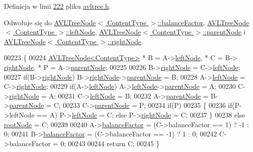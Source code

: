 Definicja w linii \hyperlink{avltree_8h_source_l00222}{222} pliku \hyperlink{avltree_8h_source}{avltree.\-h}.



Odwołuje się do \hyperlink{avltreeelement_8h_source_l00024}{A\-V\-L\-Tree\-Node$<$ Content\-Type $>$\-::balance\-Factor}, \hyperlink{avltreeelement_8h_source_l00019}{A\-V\-L\-Tree\-Node$<$ Content\-Type $>$\-::left\-Node}, \hyperlink{avltreeelement_8h_source_l00019}{A\-V\-L\-Tree\-Node$<$ Content\-Type $>$\-::parent\-Node} i \hyperlink{avltreeelement_8h_source_l00019}{A\-V\-L\-Tree\-Node$<$ Content\-Type $>$\-::right\-Node}.


\begin{DoxyCode}
00223     \{
00224       \hyperlink{class_a_v_l_tree_node}{AVLTreeNode<ContentType>} * B = A->\hyperlink{class_a_v_l_tree_node_afc53d4774f375c23795c9eb598f4d7cd}{leftNode}, * C = B->
      \hyperlink{class_a_v_l_tree_node_a51dfb148f27625c89a3a153760517c38}{rightNode}, * P = A->\hyperlink{class_a_v_l_tree_node_ae64d1261fea217d3e85928e7cf2a9151}{parentNode};
00225 
00226       B->\hyperlink{class_a_v_l_tree_node_a51dfb148f27625c89a3a153760517c38}{rightNode} = C->\hyperlink{class_a_v_l_tree_node_afc53d4774f375c23795c9eb598f4d7cd}{leftNode};
00227       \textcolor{keywordflow}{if}(B->\hyperlink{class_a_v_l_tree_node_a51dfb148f27625c89a3a153760517c38}{rightNode}) B->\hyperlink{class_a_v_l_tree_node_a51dfb148f27625c89a3a153760517c38}{rightNode}->\hyperlink{class_a_v_l_tree_node_ae64d1261fea217d3e85928e7cf2a9151}{parentNode} = B;
00228       A->\hyperlink{class_a_v_l_tree_node_afc53d4774f375c23795c9eb598f4d7cd}{leftNode} = C->\hyperlink{class_a_v_l_tree_node_a51dfb148f27625c89a3a153760517c38}{rightNode};
00229       \textcolor{keywordflow}{if}(A->\hyperlink{class_a_v_l_tree_node_afc53d4774f375c23795c9eb598f4d7cd}{leftNode}) A->\hyperlink{class_a_v_l_tree_node_afc53d4774f375c23795c9eb598f4d7cd}{leftNode}->\hyperlink{class_a_v_l_tree_node_ae64d1261fea217d3e85928e7cf2a9151}{parentNode} = A;
00230       C->\hyperlink{class_a_v_l_tree_node_a51dfb148f27625c89a3a153760517c38}{rightNode} = A;
00231       C->\hyperlink{class_a_v_l_tree_node_afc53d4774f375c23795c9eb598f4d7cd}{leftNode} = B;
00232       A->\hyperlink{class_a_v_l_tree_node_ae64d1261fea217d3e85928e7cf2a9151}{parentNode} = B->\hyperlink{class_a_v_l_tree_node_ae64d1261fea217d3e85928e7cf2a9151}{parentNode} = C;
00233       C->\hyperlink{class_a_v_l_tree_node_ae64d1261fea217d3e85928e7cf2a9151}{parentNode} = P;
00234       \textcolor{keywordflow}{if}(P)
00235       \{
00236         \textcolor{keywordflow}{if}(P->leftNode == A) P->\hyperlink{class_a_v_l_tree_node_afc53d4774f375c23795c9eb598f4d7cd}{leftNode} = C; \textcolor{keywordflow}{else} P->\hyperlink{class_a_v_l_tree_node_a51dfb148f27625c89a3a153760517c38}{rightNode} = C;
00237       \}
00238       \textcolor{keywordflow}{else} \hyperlink{class_a_v_l_tree_aee3daa1b05e59d770a95e1274f09eb22}{rootNode} = C;
00239 
00240       A->\hyperlink{class_a_v_l_tree_node_a212c57dab467b42c3ddc50b2aecc05ad}{balanceFactor} = (C->balanceFactor ==  1) ? -1 : 0;
00241       B->\hyperlink{class_a_v_l_tree_node_a212c57dab467b42c3ddc50b2aecc05ad}{balanceFactor} = (C->balanceFactor == -1) ?  1 : 0;
00242       C->balanceFactor = 0;
00243 
00244       \textcolor{keywordflow}{return} C;
00245     \}
\end{DoxyCode}

